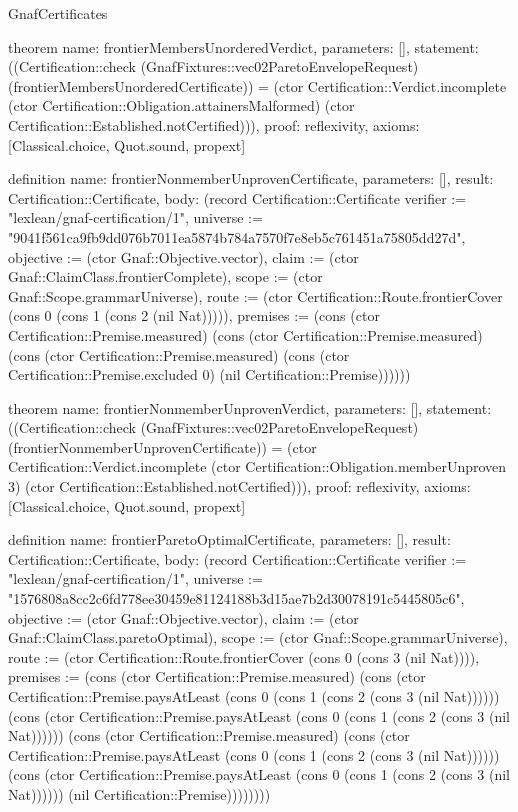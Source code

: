 \begin{lexlean}{GnafCertificates}
\begin{semanticmodule}
theorem{
  name: frontierMembersUnorderedVerdict,
  parameters: [],
  statement: ((Certification::check (GnafFixtures::vec02ParetoEnvelopeRequest) (frontierMembersUnorderedCertificate)) = (ctor Certification::Verdict.incomplete (ctor Certification::Obligation.attainersMalformed) (ctor Certification::Established.notCertified))),
  proof: reflexivity{},
  axioms: [Classical.choice, Quot.sound, propext]
}

definition{
  name: frontierNonmemberUnprovenCertificate,
  parameters: [],
  result: Certification::Certificate,
  body: (record Certification::Certificate {verifier := "lexlean/gnaf-certification/1", universe := "9041f561ca9fb9dd076b7011ea5874b784a7570f7e8eb5c761451a75805dd27d", objective := (ctor Gnaf::Objective.vector), claim := (ctor Gnaf::ClaimClass.frontierComplete), scope := (ctor Gnaf::Scope.grammarUniverse), route := (ctor Certification::Route.frontierCover (cons 0 (cons 1 (cons 2 (nil Nat))))), premises := (cons (ctor Certification::Premise.measured) (cons (ctor Certification::Premise.measured) (cons (ctor Certification::Premise.measured) (cons (ctor Certification::Premise.excluded 0) (nil Certification::Premise)))))})
}

theorem{
  name: frontierNonmemberUnprovenVerdict,
  parameters: [],
  statement: ((Certification::check (GnafFixtures::vec02ParetoEnvelopeRequest) (frontierNonmemberUnprovenCertificate)) = (ctor Certification::Verdict.incomplete (ctor Certification::Obligation.memberUnproven 3) (ctor Certification::Established.notCertified))),
  proof: reflexivity{},
  axioms: [Classical.choice, Quot.sound, propext]
}

definition{
  name: frontierParetoOptimalCertificate,
  parameters: [],
  result: Certification::Certificate,
  body: (record Certification::Certificate {verifier := "lexlean/gnaf-certification/1", universe := "1576808a8cc2c6fd778ee30459e81124188b3d15ae7b2d30078191c5445805c6", objective := (ctor Gnaf::Objective.vector), claim := (ctor Gnaf::ClaimClass.paretoOptimal), scope := (ctor Gnaf::Scope.grammarUniverse), route := (ctor Certification::Route.frontierCover (cons 0 (cons 3 (nil Nat)))), premises := (cons (ctor Certification::Premise.measured) (cons (ctor Certification::Premise.paysAtLeast (cons 0 (cons 1 (cons 2 (cons 3 (nil Nat)))))) (cons (ctor Certification::Premise.paysAtLeast (cons 0 (cons 1 (cons 2 (cons 3 (nil Nat)))))) (cons (ctor Certification::Premise.measured) (cons (ctor Certification::Premise.paysAtLeast (cons 0 (cons 1 (cons 2 (cons 3 (nil Nat)))))) (cons (ctor Certification::Premise.paysAtLeast (cons 0 (cons 1 (cons 2 (cons 3 (nil Nat)))))) (nil Certification::Premise)))))))})
}


\end{semanticmodule}
\end{lexlean}
